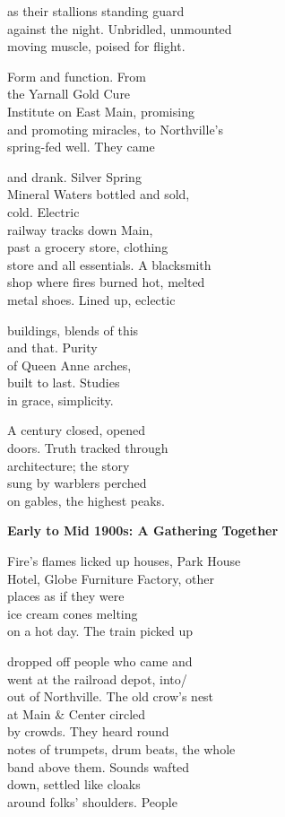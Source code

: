 \documentclass[twoside,10pt]{book}
\begin{document}
as their stallions standing guard\\
against the night. Unbridled, unmounted\\
moving muscle, poised for flight.

Form and function. From\\
the Yarnall Gold Cure\\
Institute on East Main, promising\\
and promoting miracles, to Northville's\\
spring-fed well. They came

and drank. Silver Spring\\
Mineral Waters bottled and sold,\\
cold. Electric\\
railway tracks down Main,\\
past a grocery store, clothing\\
store and all essentials. A blacksmith\\
shop where fires burned hot, melted\\
metal shoes. Lined up, eclectic

buildings, blends of this\\
and that. Purity\\
of Queen Anne arches,\\
built to last. Studies\\
in grace, simplicity.

A century closed, opened\\
doors. Truth tracked through\\
architecture; the story\\
sung by warblers perched\\
on gables, the highest peaks.

{\bf Early to Mid 1900s: A Gathering Together}

Fire's flames licked up houses, Park House\\
Hotel, Globe Furniture Factory, other\\
places as if they were\\
ice cream cones melting\\
on a hot day. The train picked up

dropped off people who came and\\
went at the railroad depot, into/\\
out of Northville. The old crow's nest\\
at Main \& Center circled\\
by crowds. They heard round\\
notes of trumpets, drum beats, the whole\\
band above them. Sounds wafted\\
down, settled like cloaks\\
around folks' shoulders. People
\end{document}
